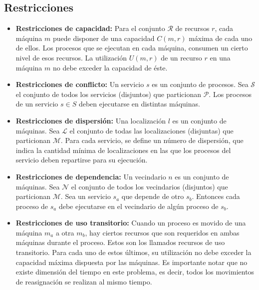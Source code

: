 \documentclass[../informe2.tex]{subfiles}
\begin{document}
\subsection{Restricciones}
\begin{itemize}
	\item \textbf{Restricciones de capacidad:} Para el conjunto $\mathcal{R}$ de recursos $r$, cada máquina $m$ puede disponer de una capacidad $C(m,r)$ máxima de cada uno de ellos. Los procesos que se ejecutan en cada máquina, consumen un cierto nivel de esos recursos. La utilización $U(m,r)$ de un recurso $r$ en una máquina $m$ no debe exceder la capacidad de éste.

	\item \textbf{Restricciones de conflicto:} Un servicio $s$ es un conjunto de procesos. Sea $\mathcal{S}$ el conjunto de todos los servicios (disjuntos) que particionan $\mathcal{P}$. Los procesos de un servicio $s \in S$ deben ejecutarse en distintas máquinas.

	\item \textbf{Restricciones de dispersión:} Una localización $l$ es un conjunto de máquinas. Sea $\mathcal{L}$ el conjunto de todas las localizaciones (disjuntas) que particionan $\mathcal{M}$. Para cada servicio, se define un número de dispersión, que indica la cantidad mínima de localizaciones en las que los procesos del servicio deben repartirse para su ejecución.

	\item \textbf{Restricciones de dependencia:} Un vecindario $n$ es un conjunto de máquinas. Sea $\mathcal{N}$ el conjunto de todos los vecindarios (disjuntos) que particionan $\mathcal{M}$. Sea un servicio $s_a$ que depende de otro $s_b$. Entonces cada proceso de $s_a$ debe ejecutarse en el vecindario de algún proceso de $s_b$.

	\item \textbf{Restricciones de uso transitorio:} Cuando un proceso es movido de una máquina $m_a$ a otra $m_b$, hay ciertos recursos que son requeridos en ambas máquinas durante el proceso. Estos son los llamados recursos de uso transitorio. Para cada uno de estos últimos, su utilización no debe exceder la capacidad máxima dispuesta por las máquinas. Es importante notar que no existe dimensión del tiempo en este problema, es decir, todos los movimientos de reasignación se realizan al mismo tiempo.
\end{itemize}
\end{document}
